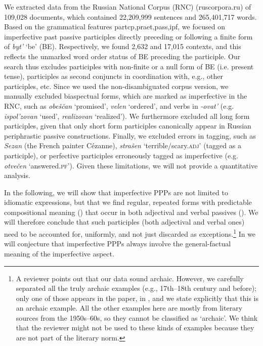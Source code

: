 \documentclass[output=paper,
modfonts,
newtxmath,
hidelinks
]{langscibook}
\begin{document}
We extracted data from the Russian National Corpus (RNC) (ruscorpora.ru) of 109,028 documents, which contained 22,209,999 sentences and 265,401,717 words.  Based on the grammatical features partcp,praet,pass,ipf, we focused on imperfective past passive participles directly preceding or following a finite form of \textit{byt'} `be' (BE). Respectively, we found 2,632 and 17,015 contexts, and this reflects the unmarked word order status of BE preceding the participle. Our search thus excludes participles with non-finite or a null form of BE (i.e. present tense), participles as second conjuncts in coordination with, e.g., other participles, etc. Since we used the non-disambiguated corpus version, we manually excluded biaspectual forms, which are marked as imperfective in the RNC, such as \textit{obeščan} `promised', \textit{velen} `ordered', and verbs in \textit{-ovat'} (e.g. \textit{ispol'zovan} `used', \textit{realizovan} `realized'). We furthermore excluded all long form participles, given that only short form participles canonically appear in Russian periphrastic passive constructions. Finally, we excluded errors in tagging, such as \textit{Sezan} (the French painter Cézanne), \textit{strašen} `terrible/scary.\textsc{adj}' (tagged as a participle), or perfective participles erroneously tagged as imperfective (e.g. \textit{otvečen} `answered.\textsc{pf}'). Given these limitations, we will not provide a quantitative analysis. 

In the following, we will show that imperfective PPPs are not limited to idiomatic expressions, but that we find regular, repeated forms with predictable compositional meaning () that occur in both adjectival and verbal passives (). We will therefore conclude that such participles (both adjectival and verbal ones) need to be accounted for, uniformly, and not just discarded as exceptions.\footnote{A reviewer points out that our data sound archaic. However, we carefully separated all the truly archaic examples (e.g., 17th--18th century and before); only one of those appears in the paper, in , and we state explicitly that this is an archaic example. All the other examples here are mostly from literary sources from the 1950s--60s, so they cannot be classified as `archaic'. We think that the reviewer might not be used to these kinds of examples because they are not part of the literary norm.} In  we will conjecture that imperfective PPPs always involve the general-factual meaning of the imperfective aspect.
\end{document}
